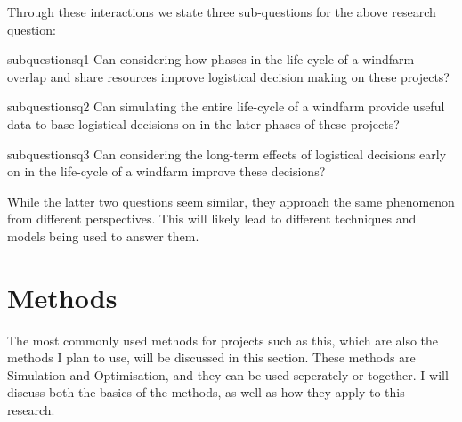 \documentclass[a4paper,12pt]{article}
\begin{document}
Through these interactions we state three sub-questions for the above research question:

\begin{restatable}{subquestion}{sq1}
\label{sq1}
Can considering how phases in the life-cycle of a windfarm overlap and share resources improve logistical decision making on these projects?
\end{restatable}

\begin{restatable}{subquestion}{sq2}
\label{sq2}
Can simulating the entire life-cycle of a windfarm provide useful data to base logistical decisions on in the later phases of these projects?
\end{restatable}

\begin{restatable}{subquestion}{sq3}
\label{sq3}
Can considering the long-term effects of logistical decisions early on in the life-cycle of a windfarm improve these decisions? 
\end{restatable}

While the latter two questions seem similar, they approach the same phenomenon from different perspectives. This will likely lead to different techniques and models being used to answer them. 

\pagebreak

\section{Methods} \label{s:meth}
The most commonly used methods for projects such as this, which are also the methods I plan to use, will be discussed in this section. These methods are Simulation and Optimisation, and they can be used seperately or together. I will discuss both the basics of the methods, as well as how they apply to this research. 
\end{document}
